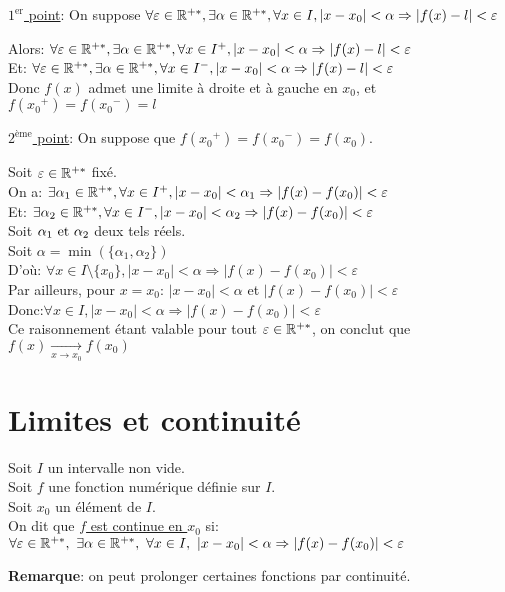 \documentclass[12pt,twoside,a4paper]{article}
\begin{document}
		\begin{preuve}
			\underline{$1^{\text{er}}$ point}: On suppose $\forall \varepsilon\in\mathbb{R}^{+*},\exists \alpha \in \mathbb{R}^{+*},\forall x\in I,\left|x-x_0 \right|<\alpha \Rightarrow \left| f(x)-l\right| <\varepsilon$
			\begin{tab}
				Alors: $\forall \varepsilon\in\mathbb{R}^{+*},\exists \alpha \in \mathbb{R}^{+*},\forall x\in I^{+},\left|x-x_0 \right|<\alpha \Rightarrow \left| f(x)-l\right| <\varepsilon$\\
				Et: $\forall \varepsilon\in\mathbb{R}^{+*},\exists \alpha \in \mathbb{R}^{+*},\forall x\in I^{-},\left|x-x_0 \right|<\alpha \Rightarrow \left| f(x)-l\right| <\varepsilon$\\
				Donc $f(x)$ admet une limite \`a droite et \`a gauche en $x_0$, et $f({x_0}^{+})=f({x_0}^{-})=l$
			\end{tab}
			\underline{$2^{\text{\`eme}}$ point}: On suppose que $f({x_0}^{+})=f({x_0}^{-})=f(x_0)$.
			\begin{tab}
				Soit $\varepsilon\in \mathbb{R}^{+*}$ fixé.\\
				On  a: $\exists \alpha_1 \in \mathbb{R}^{+*},\forall x\in I^{+},\left|x-x_0 \right|<\alpha_1 \Rightarrow \left| f(x)-f(x_0)\right| <\varepsilon$\\
				Et: $\exists \alpha_2 \in \mathbb{R}^{+*},\forall x\in I^{-},\left|x-x_0 \right|<\alpha_2 \Rightarrow \left| f(x)-f(x_0)\right| <\varepsilon$\\
				Soit $\alpha_1\text{ et }\alpha_2$ deux tels réels.\\
				Soit $\alpha=\min(\{\alpha_1, \alpha_2 \})$\\
				D'o\`u: $\forall x\in I\setminus\{x_0\},\left|x-x_0 \right|<\alpha \Rightarrow \left| f(x)-f(x_0)\right| <\varepsilon$\\
				Par ailleurs, pour $x=x_0$: $\left|x-x_0 \right|<\alpha$ et $\left| f(x)-f(x_0)\right| <\varepsilon$\\
				Donc:$\forall x\in I,\left|x-x_0 \right|<\alpha \Rightarrow \left| f(x)-f(x_0)\right| <\varepsilon$\\
				Ce raisonnement étant valable pour tout $\varepsilon\in\mathbb{R}^{+*}$, on conclut que $f(x)\mathop{\longrightarrow}\limits_{x\rightarrow x_0} f(x_0)$
			\end{tab}
		\end{preuve}
	\section{Limites et continuité}
		\begin{defi}
			Soit $I$ un intervalle non vide.\\
			Soit $f$ une fonction numérique définie sur $I$.\\
			Soit $x_0$ un élément de $I$.\\
			On dit que \underline{$f$ est continue en $x_0$} si:\\
			$\forall \varepsilon \in\R^{+*},\ \exists\alpha\in\R^{+*},\ \forall x\in I,\ |x-x_0|<\alpha\Rightarrow |f(x)-f(x_0)|<\varepsilon$
		\end{defi}
		\begin{flushleft}
			\textbf{Remarque}: on peut prolonger certaines fonctions par continuité.
		\end{flushleft}
\end{document}
